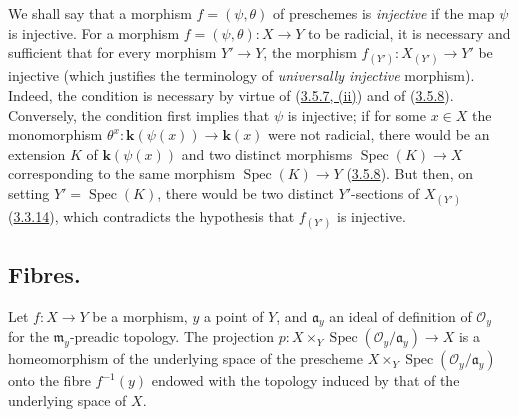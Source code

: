 \begin{remark}[3.5.11]
\label{I.3.5.11}
We shall say that a morphism $f=(\psi,\theta)$ of preschemes is
\emph{injective} if the map $\psi$ is injective. For a morphism
$f=(\psi,\theta):X\to Y$ to be radicial, it is necessary and sufficient that
for every morphism $Y'\to Y$, the morphism $f_{(Y')}:X_{(Y')}\to Y'$ be
injective (which justifies the terminology of \emph{universally injective}
morphism). Indeed, the condition is necessary by virtue of
(\hyperref[I.3.5.7]{3.5.7, (ii)}) and of
(\hyperref[I.3.5.8]{3.5.8}). Conversely, the condition first implies that
$\psi$ is injective; if for some $x\in X$ the monomorphism
$\theta^x:\boldsymbol{k}(\psi(x))\to\boldsymbol{k}(x)$ were not radicial, there would be an extension
$K$ of $\boldsymbol{k}(\psi(x))$ and two distinct morphisms
$\operatorname{Spec}(K)\to X$ corresponding to the same morphism
$\operatorname{Spec}(K)\to Y$ (\hyperref[I.3.5.8]{3.5.8}). But then, on
setting $Y'=\operatorname{Spec}(K)$, there would be two distinct $Y'$-sections
of $X_{(Y')}$ (\hyperref[I.3.3.14]{3.3.14}), which contradicts the
hypothesis that $f_{(Y')}$ is injective.
\end{remark}

\subsection{Fibres.}
\label{subsection:I.3.6}

\begin{proposition}[3.6.1]
\label{I.3.6.1}
Let $f:X\to Y$ be a morphism, $y$ a point of $Y$, and $\mathfrak{a}_y$ an
ideal of definition of $\mathcal{O}_y$ for the
$\mathfrak{m}_y$-preadic topology. The projection
$p:X\times_Y\operatorname{Spec}(\mathcal{O}_y/\mathfrak{a}_y)\to X$ is a
homeomorphism of the underlying space of the prescheme
$X\times_Y\operatorname{Spec}(\mathcal{O}_y/\mathfrak{a}_y)$ onto the fibre
$f^{-1}(y)$ endowed with the topology induced by that of the underlying space
of $X$.
\end{proposition}

